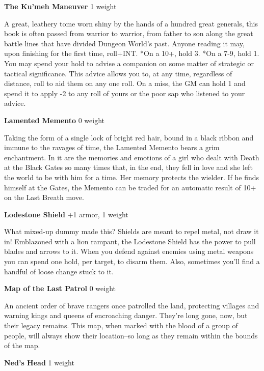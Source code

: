 {\noindent \bfseries The Ku'meh Maneuver} \hspace*{\fill} 1 weight

A great, leathery tome worn shiny by the hands of a hundred great generals, this book is often passed from warrior to warrior, from father to son along the great battle lines that have divided Dungeon World's past. Anyone reading it may, upon finishing for the first time, roll+INT. *On a 10+, hold 3. *On a 7-9, hold 1. You may spend your hold to advise a companion on some matter of strategic or tactical significance. This advice allows you to, at any time, regardless of distance, roll to aid them on any one roll. On a miss, the GM can hold 1 and spend it to apply -2 to any roll of yours or the poor sap who listened to your advice.

{\noindent \bfseries Lamented Memento} \hspace*{\fill} 0 weight

Taking the form of a single lock of bright red hair, bound in a black ribbon and immune to the ravages of time, the Lamented Memento bears a grim enchantment. In it are the memories and emotions of a girl who dealt with Death at the Black Gates so many times that, in the end, they fell in love and she left the world to be with him for a time. Her memory protects the wielder. If he finds himself at the Gates, the Memento can be traded for an automatic result of 10+ on the Last Breath move.

{\noindent \bfseries Lodestone Shield} \hspace*{\fill} +1 armor, 1 weight

What mixed-up dummy made this? Shields are meant to repel metal, not draw it in! Emblazoned with a lion rampant, the Lodestone Shield has the power to pull blades and arrows to it. When you defend against enemies using metal weapons you can spend one hold, per target, to disarm them. Also, sometimes you'll find a handful of loose change stuck to it.

{\noindent \bfseries Map of the Last Patrol} \hspace*{\fill} 0 weight

An ancient order of brave rangers once patrolled the land, protecting villages and warning kings and queens of encroaching danger. They're long gone, now, but their legacy remains. This map, when marked with the blood of a group of people, will always show their location--so long as they remain within the bounds of the map. 

{\noindent \bfseries Ned's Head} \hspace*{\fill} 1 weight

